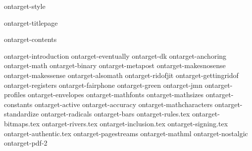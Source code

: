 

\environment ontarget-style

\dontcomplain

\startdocument

    \component ontarget-titlepage

    \startfrontmatter
        \component ontarget-contents
    \stopfrontmatter

    \startbodymatter
        \component ontarget-introduction
        \component ontarget-eventually
        \component ontarget-dk
        \component ontarget-anchoring
        \component ontarget-math
        \component ontarget-binary
        \component ontarget-metapost
        \component ontarget-makesnosense
        \component ontarget-makessense
        \component ontarget-alsomath
        \component ontarget-ridofjit
        \component ontarget-gettingridof
        \component ontarget-registers
        \component ontarget-fairphone
        \component ontarget-green
        \component ontarget-jmn
        \component ontarget-profiles
        \component ontarget-envelopes
        \component ontarget-mathfonts
        \component ontarget-mathsizes
        \component ontarget-constants
        \component ontarget-active
        \component ontarget-accuracy
        \component ontarget-mathcharacters
        \component ontarget-standardize
        \component ontarget-radicals
        \component ontarget-bars
        \component ontarget-rules.tex
        \component ontarget-bitmaps.tex
        \component ontarget-rivers.tex
        \component ontarget-inclusion.tex
        \component ontarget-signing.tex
        \component ontarget-authentic.tex
        \component ontarget-pagestreams
        \component ontarget-mathml
        \component ontarget-nostalgic
        \component ontarget-pdf-2
    \stopbodymatter

\stopdocument

